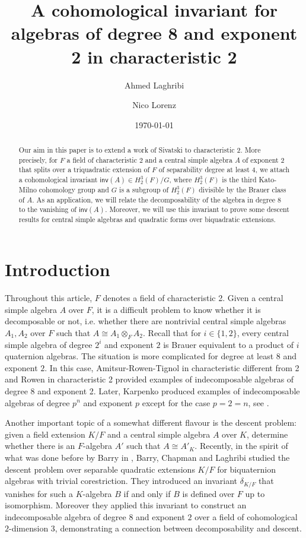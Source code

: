 \documentclass{amsart}
\author{Ahmed Laghribi}
\title[Cohomological invariants in characteristic 2]{A cohomological invariant for algebras of degree 8 and exponent 2 in characteristic 2}
\author{Nico Lorenz}
\date{\today}
\numberwithin{equation}{section}
\newcommand{\inv}{\mathsf{inv}}
\begin{document}
\begin{abstract}
    Our aim in this paper is to extend a work of Sivatski \cite{Sivatski_CohoInv} to characteristic 2.
	More precisely, for $F$ a field of characteristic $2$ and a central simple algebra $A$ of exponent 2 that splits over a triquadratic extension of $F$ of separability degree at least 4, we attach a cohomological invariant $\inv(A) \in H_2^3(F) / G$, where $H_2^3(F)$ is the third Kato-Milno cohomology group and $G$ is a subgroup of $H_2^3(F)$ divisible by the Brauer class of $A$.
	As an application, we will relate the decomposability of the algebra in degree 8 to the vanishing of $\inv(A)$.
	Moreover, we will use this invariant to prove some descent results for central simple algebras and quadratic forms over biquadratic extensions.
\end{abstract}

\maketitle




\section{Introduction} \label{Sec_Intro}

Throughout this article, $F$ denotes a field of characteristic 2. 
Given a central simple algebra $A$ over $F$, it is a difficult problem to know whether it is decomposable or not, i.e. whether there are nontrivial central simple algebras $A_1, A_2$ over $F$ such that $A \cong A_1 \otimes_F A_2$.
Recall that for $i\in \{1, 2\}$, every central simple algebra of degree $2^i$ and exponent $2$ is Brauer equivalent to a product of $i$ quaternion algebras.
The situation is more complicated for degree at least $8$ and exponent $2$.
In this case, Amitsur-Rowen-Tignol \cite[Theorem 5.1]{AmitsurRownTignol_DivisionAlgebras} in characteristic different from 2 and Rowen \cite[Section 3]{Rowen_DivisionAlgebraExp2Char2} in characteristic 2 provided examples of indecomposable algebras of degree 8 and exponent 2.
Later, Karpenko produced examples of indecomposable algebras of degree $p^n$ and exponent $p$ except for the case $p = 2 = n$, see \cite[Corollary 5.4]{Karpenko_Codim2Cycles}.

Another important topic of a somewhat different flavour is the descent problem: given a field extension $K / F$ and a central simple algebra $A$ over $K$, determine whether there is an $F$-algebra $A'$ such that $A \cong A'_K$.
Recently, in the spirit of what was done before by Barry in \cite{Barry_DecompAlgebrasDeg8Exp2}, Barry, Chapman and Laghribi \cite{BarryChapmanLaghribi_DescentBiquaternion} studied the descent problem over separable quadratic extensions $K/F$ for biquaternion algebras with trivial corestriction.
They introduced an invariant $\delta_{K/F}$ that vanishes for such a $K$-algebra $B$ if and only if $B$ is defined over $F$ up to isomorphism.
Moreover they applied this invariant to construct an indecomposable algebra of degree $8$ and exponent $2$ over a field of cohomological $2$-dimension 3, demonstrating a connection between decomposability and descent.
\end{document}
